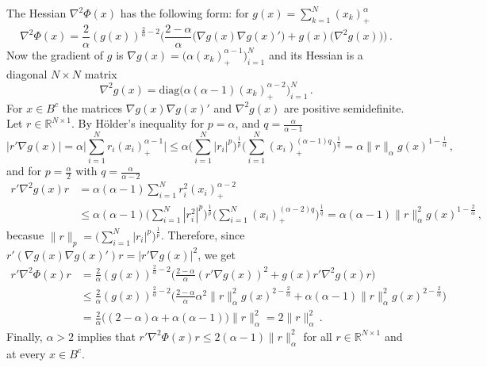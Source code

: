\documentclass[a4paper]{article}
\newcommand{\Real}{\mathbb{R}}
\begin{document}
The Hessian $\nabla^2 \Phi(x)$ has the following form: for $g(x) = \sum_{k=1}^N (x_k)_+^\alpha$
\begin{equation*}
  \nabla^2 \Phi(x)
    = \frac{2}{\alpha} (g(x))^{\frac{2}{\alpha} - 2}
      \biggl( \frac{2 - \alpha}{\alpha} \bigl(\nabla g(x) \nabla g(x)'\bigr)
              + g(x) \bigl(\nabla^2 g(x)\bigr)
      \biggr) \,.
\end{equation*}
Now the gradient of $g$ is $\nabla g(x) = \bigl(\alpha (x_k)_+^{\alpha-1} \bigr)_{i=1}^N$
and its Hessian is a diagonal $N\times N$ matrix
\begin{equation*}
  \nabla^2 g(x) = \text{diag}\bigl(\alpha (\alpha-1) (x_k)_+^{\alpha-2} \bigr)_{i=1}^N \,.
\end{equation*}
For $x\in B^c$ the matrices $\nabla g(x) \nabla g(x)'$ and $\nabla^2 g(x)$ are positive
semidefinite. Let $r\in \Real^{N\times 1}$. By H\"older's inequality for $p=\alpha$, and
$q = \frac{\alpha}{\alpha-1}$
\begin{equation*}
  |r' \nabla g(x)|
    = \alpha \biggl| \sum_{i=1}^N r_i (x_i)_+^{\alpha-1} \biggr|
    \leq \alpha
      \biggl(\sum_{i=1}^N |r_i|^p\biggr)^\frac{1}{p}
      \biggl(\sum_{i=1}^N (x_i)_+^{(\alpha-1)q} \biggr)^\frac{1}{q}
    = \alpha \|r\|_\alpha g(x)^{1-\frac{1}{\alpha}} \,,
\end{equation*}
and for $p=\frac{\alpha}{2}$ with $q = \frac{\alpha}{\alpha-2}$
\begin{align*}
  r' \nabla^2 g(x) r
    &= \alpha (\alpha-1) \sum_{i=1}^N r_i^2 (x_i)_+^{\alpha-2} \\
    &\leq \alpha (\alpha-1) 
      \biggl(\sum_{i=1}^N |r_i^2|^p\biggr)^\frac{1}{p}
      \biggl(\sum_{i=1}^N (x_i)_+^{(\alpha-2)q} \biggr)^\frac{1}{q}
    = \alpha (\alpha-1) \|r\|_\alpha^2 g(x)^{1-\frac{2}{\alpha}} \,,
\end{align*}
becasue $\|r\|_p = \bigl(\sum_{i=1}^N |r_i|^p\bigr)^\frac{1}{p}$. Therefore, since
$r' (\nabla g(x) \nabla g(x)') r = |r' \nabla g(x)|^2$, we get
\begin{align*}
  r'\nabla^2 \Phi(x)r
    & = \frac{2}{\alpha} (g(x))^{\frac{2}{\alpha} - 2}
      \biggl( \frac{2 - \alpha}{\alpha} (r'\nabla g(x))^2
              + g(x) r'\nabla^2 g(x) r \biggr) \\
    &\leq \frac{2}{\alpha} (g(x))^{\frac{2}{\alpha} - 2}
      \biggl( \frac{2 - \alpha}{\alpha} \alpha^2 \|r\|_\alpha^2 g(x)^{2-\frac{2}{\alpha}}
              + \alpha (\alpha-1) \|r\|_\alpha^2 g(x)^{2-\frac{2}{\alpha}}
      \biggr) \\
    &=\frac{2}{\alpha} \bigl( (2 - \alpha) \alpha + \alpha (\alpha - 1) \bigr) \|r\|_\alpha^2
    = 2 \|r\|_\alpha^2 \,.
\end{align*}
Finally, $\alpha > 2$ implies that $r'\nabla^2 \Phi(x) r \leq 2(\alpha-1)\|r\|_\alpha^2$
for all $r\in \Real^{N\times 1}$ and at every $x\in B^c$.
\end{document}
